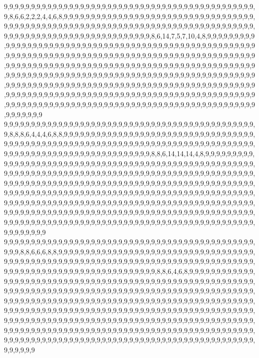 9,9,9,9,9,9,9,9,9,9,9,9,9,9,9,9,9,9,9,9,9,9,9,9,9,9,9,9,9,9,9,9,9,9,9,9,9,9,9,9,9,9,9,9,9,9,9,8,6,6,2,2,2,4,4,6,8,9,9,9,9,9,9,9,9,9,9,9,9,9,9,9,9,9,9,9,9,9,9,9,9,9,9,9,9,9,9,9,9,9,9,9,9,9,9,9,9,9,9,9,9,9,9,9,9,9,9,9,9,9,9,9,9,9,9,9,9,9,9,9,9,9,9,9,9,9,9,9,9,9,9,9,9,9,9,9,9,9,9,9,9,9,9,9,9,9,9,9,9,9,9,9,9,9,9,9,9,9,9,9,9,9,9,9,9,8,6,14,7,5,7,10,4,8,9,9,9,9,9,9,9,9,9,9,9,9,9,9,9,9,9,9,9,9,9,9,9,9,9,9,9,9,9,9,9,9,9,9,9,9,9,9,9,9,9,9,9,9,9,9,9,9,9,9,9,9,9,9,9,9,9,9,9,9,9,9,9,9,9,9,9,9,9,9,9,9,9,9,9,9,9,9,9,9,9,9,9,9,9,9,9,9,9,9,9,9,9,9,9,9,9,9,9,9,9,9,9,9,9,9,9,9,9,9,9,9,9,9,9,9,9,9,9,9,9,9,9,9,9,9,9,9,9,9,9,9,9,9,9,9,9,9,9,9,9,9,9,9,9,9,9,9,9,9,9,9,9,9,9,9,9,9,9,9,9,9,9,9,9,9,9,9,9,9,9,9,9,9,9,9,9,9,9,9,9,9,9,9,9,9,9,9,9,9,9,9,9,9,9,9,9,9,9,9,9,9,9,9,9,9,9,9,9,9,9,9,9,9,9,9,9,9,9,9,9,9,9,9,9,9,9,9,9,9,9,9,9,9,9,9,9,9,9,9,9,9,9,9,9,9,9,9,9,9,9,9,9,9,9,9,9,9,9,9,9,9,9,9,9,9,9,9,9,9,9,9,9,9,9,9,9,9,9,9,9,9,9,9,9,9,9,9,9,9,9,9,9,9,9,9,9,9,9,9,9,9,9,9,9,9,9,9,9,9,9,9,9,9,9,9,9,9,9,9,9,9,9,9,9,9,9,9,9,9,9,9,9,9,9,9,9,9
9,9,9,9,9,9,9,9,9,9,9,9,9,9,9,9,9,9,9,9,9,9,9,9,9,9,9,9,9,9,9,9,9,9,9,9,9,9,9,9,9,9,9,9,9,9,9,8,8,8,6,4,4,4,6,8,8,9,9,9,9,9,9,9,9,9,9,9,9,9,9,9,9,9,9,9,9,9,9,9,9,9,9,9,9,9,9,9,9,9,9,9,9,9,9,9,9,9,9,9,9,9,9,9,9,9,9,9,9,9,9,9,9,9,9,9,9,9,9,9,9,9,9,9,9,9,9,9,9,9,9,9,9,9,9,9,9,9,9,9,9,9,9,9,9,9,9,9,9,9,9,9,9,9,9,9,9,9,9,9,9,9,9,9,9,8,8,6,14,14,14,4,8,9,9,9,9,9,9,9,9,9,9,9,9,9,9,9,9,9,9,9,9,9,9,9,9,9,9,9,9,9,9,9,9,9,9,9,9,9,9,9,9,9,9,9,9,9,9,9,9,9,9,9,9,9,9,9,9,9,9,9,9,9,9,9,9,9,9,9,9,9,9,9,9,9,9,9,9,9,9,9,9,9,9,9,9,9,9,9,9,9,9,9,9,9,9,9,9,9,9,9,9,9,9,9,9,9,9,9,9,9,9,9,9,9,9,9,9,9,9,9,9,9,9,9,9,9,9,9,9,9,9,9,9,9,9,9,9,9,9,9,9,9,9,9,9,9,9,9,9,9,9,9,9,9,9,9,9,9,9,9,9,9,9,9,9,9,9,9,9,9,9,9,9,9,9,9,9,9,9,9,9,9,9,9,9,9,9,9,9,9,9,9,9,9,9,9,9,9,9,9,9,9,9,9,9,9,9,9,9,9,9,9,9,9,9,9,9,9,9,9,9,9,9,9,9,9,9,9,9,9,9,9,9,9,9,9,9,9,9,9,9,9,9,9,9,9,9,9,9,9,9,9,9,9,9,9,9,9,9,9,9,9,9,9,9,9,9,9,9,9,9,9,9,9,9,9,9,9,9,9,9,9,9,9,9,9,9,9,9,9,9,9,9,9,9,9,9,9,9,9,9,9,9,9,9,9,9,9,9,9,9,9,9,9,9,9,9,9,9,9,9,9,9,9,9,9,9,9,9,9,9,9,9,9,9,9,9,9,9,9
9,9,9,9,9,9,9,9,9,9,9,9,9,9,9,9,9,9,9,9,9,9,9,9,9,9,9,9,9,9,9,9,9,9,9,9,9,9,9,9,9,9,9,9,9,9,9,9,9,8,8,6,6,6,8,8,9,9,9,9,9,9,9,9,9,9,9,9,9,9,9,9,9,9,9,9,9,9,9,9,9,9,9,9,9,9,9,9,9,9,9,9,9,9,9,9,9,9,9,9,9,9,9,9,9,9,9,9,9,9,9,9,9,9,9,9,9,9,9,9,9,9,9,9,9,9,9,9,9,9,9,9,9,9,9,9,9,9,9,9,9,9,9,9,9,9,9,9,9,9,9,9,9,9,9,9,9,9,9,9,9,9,9,9,9,9,8,8,6,4,6,8,9,9,9,9,9,9,9,9,9,9,9,9,9,9,9,9,9,9,9,9,9,9,9,9,9,9,9,9,9,9,9,9,9,9,9,9,9,9,9,9,9,9,9,9,9,9,9,9,9,9,9,9,9,9,9,9,9,9,9,9,9,9,9,9,9,9,9,9,9,9,9,9,9,9,9,9,9,9,9,9,9,9,9,9,9,9,9,9,9,9,9,9,9,9,9,9,9,9,9,9,9,9,9,9,9,9,9,9,9,9,9,9,9,9,9,9,9,9,9,9,9,9,9,9,9,9,9,9,9,9,9,9,9,9,9,9,9,9,9,9,9,9,9,9,9,9,9,9,9,9,9,9,9,9,9,9,9,9,9,9,9,9,9,9,9,9,9,9,9,9,9,9,9,9,9,9,9,9,9,9,9,9,9,9,9,9,9,9,9,9,9,9,9,9,9,9,9,9,9,9,9,9,9,9,9,9,9,9,9,9,9,9,9,9,9,9,9,9,9,9,9,9,9,9,9,9,9,9,9,9,9,9,9,9,9,9,9,9,9,9,9,9,9,9,9,9,9,9,9,9,9,9,9,9,9,9,9,9,9,9,9,9,9,9,9,9,9,9,9,9,9,9,9,9,9,9,9,9,9,9,9,9,9,9,9,9,9,9,9,9,9,9,9,9,9,9,9,9,9,9,9,9,9,9,9,9,9,9,9,9,9,9,9,9,9,9,9,9,9,9,9,9,9,9,9,9,9,9,9,9,9,9,9,9,9,9,9,9,9,9
